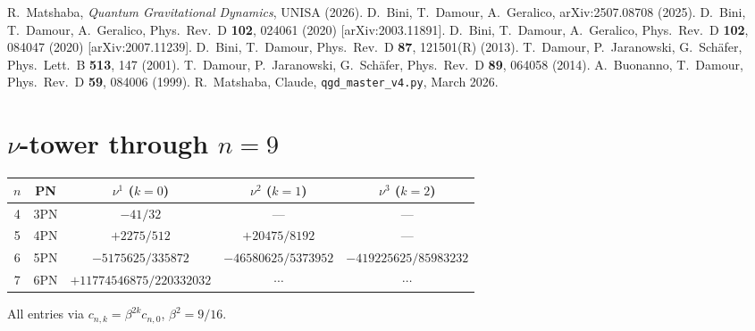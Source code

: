 \documentclass[11pt,a4paper]{article}
\theoremstyle{plain}
\theoremstyle{remark}
\begin{document}
\begin{thebibliography}{9}
R.~Matshaba,
\textit{Quantum Gravitational Dynamics}, UNISA (2026).
D.~Bini, T.~Damour, A.~Geralico,
arXiv:2507.08708 (2025).
D.~Bini, T.~Damour, A.~Geralico,
Phys.\ Rev.\ D \textbf{102}, 024061 (2020) [arXiv:2003.11891].
D.~Bini, T.~Damour, A.~Geralico,
Phys.\ Rev.\ D \textbf{102}, 084047 (2020) [arXiv:2007.11239].
D.~Bini, T.~Damour, Phys.\ Rev.\ D \textbf{87}, 121501(R) (2013).
T.~Damour, P.~Jaranowski, G.~Sch\"afer, Phys.\ Lett.\ B \textbf{513}, 147 (2001).
T.~Damour, P.~Jaranowski, G.~Sch\"afer, Phys.\ Rev.\ D \textbf{89}, 064058 (2014).
A.~Buonanno, T.~Damour, Phys.\ Rev.\ D \textbf{59}, 084006 (1999).
R.~Matshaba, Claude,
\texttt{qgd\_master\_v4.py}, March 2026.
\end{thebibliography}

\appendix
\section{$\nu$-tower through $n=9$}
\begin{center}
\renewcommand{\arraystretch}{1.2}
\begin{tabular}{ccccc}
\toprule
$n$ & PN & $\nu^1$ ($k=0$) & $\nu^2$ ($k=1$) & $\nu^3$ ($k=2$) \\
\midrule
4 & 3PN & $-41/32$ & --- & --- \\
5 & 4PN & $+2275/512$ & $+20475/8192$ & --- \\
6 & 5PN & $-5175625/335872$ & $-46580625/5373952$ & $-419225625/85983232$ \\
7 & 6PN & $+11774546875/220332032$ & $\cdots$ & $\cdots$ \\
\bottomrule
\end{tabular}
\end{center}
All entries via $c_{n,k}=\beta^{2k}c_{n,0}$, $\beta^2=9/16$.
\end{document}
